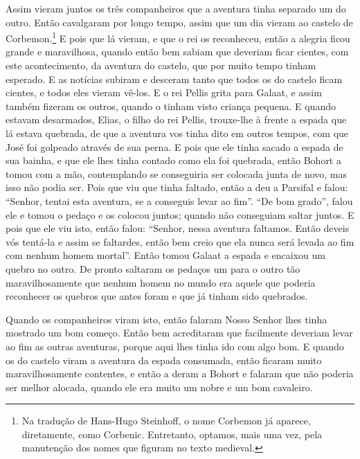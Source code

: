 Assim vieram juntos os três companheiros que a aventura tinha separado um do
outro. Então cavalgaram por longo tempo, assim que um dia vieram ao castelo de
Corbemon.\footnote{ Na tradução de Hans-Hugo Steinhoff, o nome Corbemon já
aparece, diretamente, como Corbenic. Entretanto, optamos, mais uma vez, pela
manutenção dos nomes que figuram no texto medieval.} E pois que lá
vieram, e que o rei os reconheceu, então a alegria ficou grande e maravilhosa,
quando então bem sabiam que deveriam ficar cientes, com este acontecimento, da
aventura do castelo, que por muito tempo tinham esperado. E as notícias subiram
e desceram tanto que todos os do castelo ficam cientes, e todos eles vieram
vê-los. E o rei Pellis grita para Galaat, e assim também fizeram os outros,
quando o tinham visto criança pequena. E quando estavam desarmados, Elias, o
filho do rei Pellis, trouxe-lhe à frente a espada que lá estava quebrada, de
que a aventura vos tinha dito em outros tempos,  com que José foi
golpeado através de sua perna. E pois que ele tinha sacado a espada de sua
bainha, e que ele lhes tinha contado como ela foi quebrada, então Bohort a
tomou com a mão, contemplando se conseguiria ser colocada junta de novo, mas
isso não podia ser. Pois que viu que tinha faltado, então a deu a Parsifal e
falou: “Senhor, tentai esta aventura, se a conseguis levar ao fim”. “De bom
grado”, falou ele e tomou o pedaço e os colocou juntos; quando não conseguiam
saltar juntos. E pois que ele viu isto, então falou: “Senhor, nessa aventura
faltamos. Então deveis vós tentá-la e assim se faltardes, então bem creio que
ela nunca será levada ao fim com nenhum homem mortal”. Então tomou Galaat a
espada e encaixou um quebro no outro. De pronto saltaram os pedaços um para o
outro tão maravilhosamente que nenhum homem no mundo era aquele que poderia
reconhecer os quebros que antes foram e que já tinham sido quebrados.

Quando os companheiros viram isto, então falaram Nosso Senhor lhes tinha
mostrado um bom começo. Então bem acreditaram que facilmente deveriam levar ao
fim as outras aventuras, porque aqui lhes tinha ido com algo bom. E quando os
do castelo viram a aventura da espada consumada, então ficaram muito
maravilhosamente contentes, e então a deram a Bohort e falaram que não poderia
ser melhor alocada, quando ele era muito um nobre e um bom cavaleiro.

